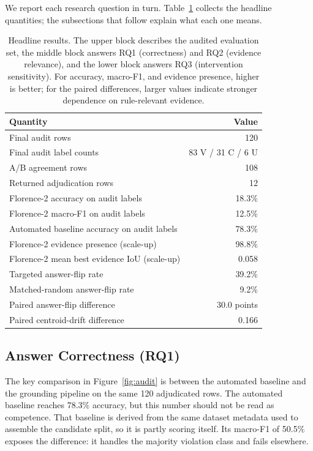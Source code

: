 \documentclass[conference]{IEEEtran}
\begin{document}
We report each research question in turn. Table~\ref{tab:headline} collects the headline quantities; the subsections that follow explain what each one means.

\begin{table}[tb]
\centering
\caption{Headline results. The upper block describes the audited evaluation set, the middle block answers RQ1 (correctness) and RQ2 (evidence relevance), and the lower block answers RQ3 (intervention sensitivity). For accuracy, macro-F1, and evidence presence, higher is better; for the paired differences, larger values indicate stronger dependence on rule-relevant evidence.}
\label{tab:headline}
{\footnotesize
\begin{tabular}{lr}
\toprule
Quantity & Value \\
\midrule
Final audit rows & 120 \\
Final audit label counts & 83 V / 31 C / 6 U \\
A/B agreement rows & 108 \\
Returned adjudication rows & 12 \\
\addlinespace
Florence-2 accuracy on audit labels & 18.3\% \\
Florence-2 macro-F1 on audit labels & 12.5\% \\
Automated baseline accuracy on audit labels & 78.3\% \\
Florence-2 evidence presence (scale-up) & 98.8\% \\
Florence-2 mean best evidence IoU (scale-up) & 0.058 \\
\addlinespace
Targeted answer-flip rate & 39.2\% \\
Matched-random answer-flip rate & 9.2\% \\
Paired answer-flip difference & 30.0 points \\
Paired centroid-drift difference & 0.166 \\
\bottomrule
\end{tabular}
\par}
\end{table}

\subsection{Answer Correctness (RQ1)}

The key comparison in Figure~\ref{fig:audit} is between the automated baseline and the grounding pipeline on the same 120 adjudicated rows. The automated baseline reaches 78.3\% accuracy, but this number should not be read as competence. That baseline is derived from the same dataset metadata used to assemble the candidate split, so it is partly scoring itself. Its macro-F1 of 50.5\% exposes the difference: it handles the majority violation class and fails elsewhere.
\end{document}
